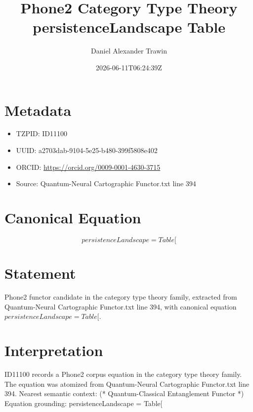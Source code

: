 \documentclass[11pt]{article}
\title{Phone2 Category Type Theory persistenceLandscape Table}
\author{Daniel Alexander Trawin}
\date{2026-06-11T06:24:39Z}
\begin{document}
\maketitle
\section*{Metadata}
\begin{itemize}
\item TZPID: ID11100
\item UUID: a2703dab-9104-5e25-b480-399f5808e402
\item ORCID: \url{https://orcid.org/0009-0001-4630-3715}
\item Source: Quantum-Neural Cartographic Functor.txt line 394
\end{itemize}
\section*{Canonical Equation}
\[
persistenceLandscape = Table[
\]
\section*{Statement}
Phone2 functor candidate in the category type theory family, extracted from Quantum-Neural Cartographic Functor.txt line 394, with canonical equation $persistenceLandscape = Table[$.
\section*{Interpretation}
ID11100 records a Phone2 corpus equation in the category type theory family. The equation was atomized from Quantum-Neural Cartographic Functor.txt line 394. Nearest semantic context: (* Quantum-Classical Entanglement Functor *) Equation grounding: persistenceLandscape = Table[
\end{document}

